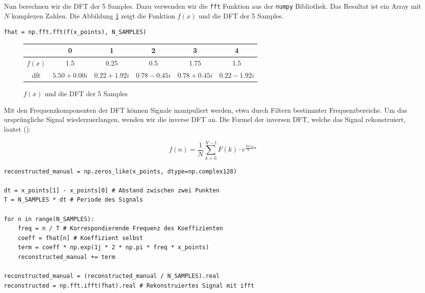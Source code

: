 \documentclass[11pt,a4paper]{article}
\begin{document}
\noindent
Nun berechnen wir die DFT der 5 Samples. Dazu verwenden wir die \texttt{fft} Funktion aus der
\texttt{numpy} Bibliothek. Das Resultat ist ein Array mit \(N\) komplexen Zahlen. Die Abbildung 
\ref{fig:dft_example_table} zeigt die Funktion \(f(x)\) und die DFT der 5 Samples.

\begin{lstlisting}
fhat = np.fft.fft(f(x_points), N_SAMPLES)
\end{lstlisting}

\begin{figure}[h]
    \centering
    \begin{tabular}{|c|c|c|c|c|c|}
    \hline
    & 0 & 1 & 2 & 3 & 4 \\
    \hline
    \(f(x)\) & 1.5 & 0.25 & 0.5 & 1.75 & 1.5 \\
    \hline
    dft & \(5.50 + 0.00i\) & \(0.22 + 1.92i\) & \(0.78 - 0.45i\) & \(0.78 + 0.45i\) & \(0.22 - 1.92i\) \\
    \hline
    \end{tabular}
    \caption{\(f(x)\) und die DFT der 5 Samples}
    \label{fig:dft_example_table}
\end{figure}

\noindent
Mit den Frequenzkomponenten der DFT können Signale manipuliert werden, etwa durch Filtern 
bestimmter Frequenzbereiche. Um das ursprüngliche Signal wiederzuerlangen, wenden wir die inverse 
DFT an. Die Formel der inversen DFT, welche das Signal rekonstruiert, lautet 
(\cite[Chapter~3]{hansen2014fourier}):


\[
f(n) = \frac{1}{N} \sum_{k=0}^{N-1} F(k) \cdot e^{\frac{2\pi i}{N} kn}
\]

\begin{lstlisting}
reconstructed_manual = np.zeros_like(x_points, dtype=np.complex128)

dt = x_points[1] - x_points[0] # Abstand zwischen zwei Punkten
T = N_SAMPLES * dt # Periode des Signals

for n in range(N_SAMPLES):
    freq = n / T # Korrespondierende Frequenz des Koeffizienten
    coeff = fhat[n] # Koeffizient selbst
    term = coeff * np.exp(1j * 2 * np.pi * freq * x_points)
    reconstructed_manual += term

reconstructed_manual = (reconstructed_manual / N_SAMPLES).real
reconstructed = np.fft.ifft(fhat).real # Rekonstruiertes Signal mit ifft
\end{lstlisting}
\end{document}
